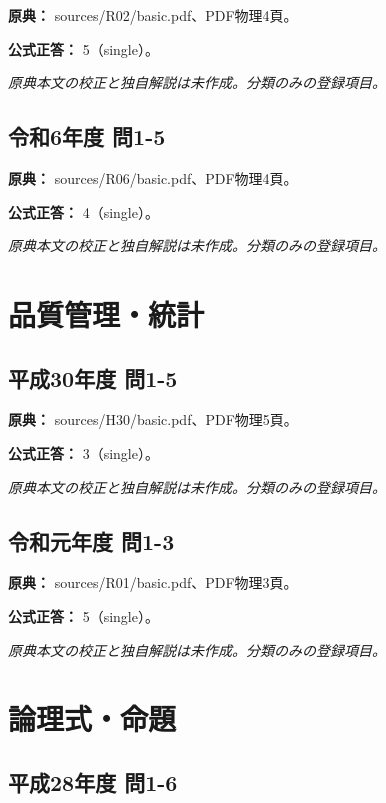 \noindent\textbf{原典：} sources/R02/basic.pdf、PDF物理4頁。

\textbf{公式正答：} 5（single）。

\par\textit{原典本文の校正と独自解説は未作成。分類のみの登録項目。}

\subsection{令和6年度 問1-5}
\label{q:r06-reg-basic-1-5}

\noindent\textbf{原典：} sources/R06/basic.pdf、PDF物理4頁。

\textbf{公式正答：} 4（single）。

\par\textit{原典本文の校正と独自解説は未作成。分類のみの登録項目。}

\section{品質管理・統計}

\subsection{平成30年度 問1-5}
\label{q:h30-reg-basic-1-5}

\noindent\textbf{原典：} sources/H30/basic.pdf、PDF物理5頁。

\textbf{公式正答：} 3（single）。

\par\textit{原典本文の校正と独自解説は未作成。分類のみの登録項目。}

\subsection{令和元年度 問1-3}
\label{q:r01-reg-basic-1-3}

\noindent\textbf{原典：} sources/R01/basic.pdf、PDF物理3頁。

\textbf{公式正答：} 5（single）。

\par\textit{原典本文の校正と独自解説は未作成。分類のみの登録項目。}

\section{論理式・命題}

\subsection{平成28年度 問1-6}
\label{q:h28-reg-basic-1-6}

